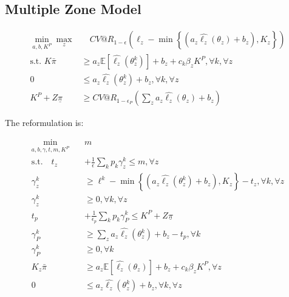 \documentclass[11pt]{article}
\begin{document}
    \subsection*{Multiple Zone Model}
    
    \begin{align}
        \min_{a,b,K^P} \max_z &\quad CV@R_{1-\epsilon}(\ell_z - \min\left\{(a_z\hat{\ell_z}(\theta_z) + b_z), K_z\right\})\\
        \text{s.t.   } K\bar{\pi} &\geq a_z \mathbb{E}[\hat{\ell_z}(\theta^k_z)] + b_z + c_k\beta_z K^P,  \forall k, \forall z\\
        0 &\leq a_z\hat{\ell_z}(\theta^k_z) + b_z, \forall k, \forall z \\
        K^P + Z\underline{\pi} &\geq CV@R_{1-\epsilon_P}\left( \sum_z a_z \hat{\ell_z}(\theta_z) + b_z \right)
    \end{align}
    
    The reformulation is: 
    
    \begin{align}
        \min_{a,b,\gamma,t,m,K^P} \quad & m\\
        \text{s.t.} \quad t_z &+ \frac{1}{\epsilon} \sum_k p_k \gamma_z^k \leq m, \forall z\\
        \gamma_z^k &\geq \ell^k - \min\left\{(a_z\hat{\ell_z}(\theta_z^k) + b_z), K_z\right\} -t_z, \forall k, \forall z \\
        \gamma_z^k &\geq 0, \forall k, \forall z\\
        t_p &+ \frac{1}{\epsilon_p} \sum_k p_k \gamma_P^k \leq K^P+Z\underline{\pi}\\
        \gamma_P^k &\geq \sum_z a_z \hat{\ell_z}(\theta^k_z) + b_z -t_p, \forall k \\
        \gamma_P^k &\geq 0, \forall k\\
        K_z\bar{\pi} &\geq a_z \mathbb{E}[\hat{\ell_z}(\theta_z)] + b_z + c_k \beta_z K^P, \forall z \\
        0 &\leq a_z \hat{\ell_z}(\theta_z^k) + b_z, \forall k, \forall z
    \end{align}
    
    
\end{document}
